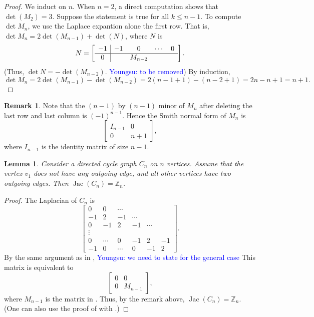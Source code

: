 \documentclass[11pt,reqno]{amsart}
\DeclareMathOperator{\Jac}{Jac}
\newcommand{\youngsu}[1]{{\textcolor{blue}{Youngsu: #1}}}
\theoremstyle{definition}
\newtheorem{rmk}[mydef]{Remark}
\theoremstyle{plain}
\newtheorem{lemma}[mydef]{Lemma}
\begin{document}
\begin{proof}
We induct on $n$. 
When $n=2$, a direct computation shows that $\det(M_2) = 3$. 
Suppose the statement is true for all $k \le n-1$. 
To compute $\det M_n$, 
we use the Laplace expantion alone the first row.
That is, $\det M_n = 2 \det (M_{n-1}) + \det(N)$, where $N$ is
\begin{equation}
N = \left[ \begin{array}{c|c c c c c  }
-1 &  -1& 0 & \cdots & 0 \\
\hline 
0 &  &  M_{n-2}
\end{array} \right].
\end{equation}
(Thus, $\det N = - \det (M_{n-2})$. \youngsu{to be removed})
By induction, $\det M_n = 2 \det (M_{n-1}) - \det(M_{n-2}) = 2 (n-1+1) - (n-2+1) = 2n - n + 1 = n + 1.$
\end{proof}

\begin{rmk}
Note that the $(n-1)$ by $(n-1)$ minor of $M_n$ after deleting the last row and last column is $(-1)^{n-1}$. 
Hence the Smith normal form of $M_n$ is 
\begin{equation}
\left[ \begin{array}{c|c}
I_{n-1} & 0 \\
\hline 
0 & n+1 
\end{array} \right],
\end{equation}
where $I_{n-1}$ is the identity matrix of size $n-1$. 
\end{rmk}

\begin{lemma} Consider a directed cycle graph $C_n$ on $n$ vertices. 
Assume that the vertex $v_1$ does not have any outgoing edge, and all other vertices have two outgoing edges. 
Then $\Jac (C_n) = \mathbb{Z}_n$.
\end{lemma}

\begin{proof}
The Laplacian of $C_n$ is 
\begin{equation}
\begin{bmatrix}
0 & 0 & \cdots \\
-1 & 2 & -1 & \cdots \\
0 & -1 & 2 & -1 & \cdots \\
\vdots \\
0 &  \cdots& 0 & -1 & 2 & -1 \\
-1 &  0 & \cdots & 0 &  -1 & 2 
\end{bmatrix}. 
\end{equation}
By the same argument as in , 
\youngsu{we need to state \Cref{lemma: obj2} for the general case}
This matrix is equivalent to 
\begin{equation}
\left[ \begin{array}{c|c}
0 & 0 \\
\hline 
0 & M_{n-1}
\end{array} \right],
\end{equation}
where $M_{n-1}$ is the matrix in .
Thus, by the remark above, $\Jac (C_n) = \mathbb{Z}_n$. 
(One can also use the proof of  with .)
\end{proof}
\end{document}
